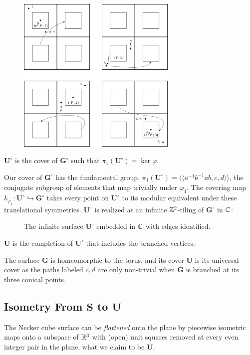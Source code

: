 \documentclass[]{article}
\def\bU{\mathbf{U}} \def\btU{\tilde{\bU}} \def\bUs{\bU^\circ}
\def\bG{\mathbf{G}} \def\bGs{\mathbf{G}^\circ}
\def\<{\langle} \def\>{\rangle}
\begin{document}
\begin{figure}[H]
\centering
\includegraphics[width=3in]{coverdirection.png}
\end{figure}


\newpage
\begin{Def}
$\bUs$ is the cover of $\bGs$ such that $\pi_1(\bUs)=\ker\varphi$.
\end{Def}

Our cover of $\bGs$ has the fundamental group, $\pi_1(\bUs)=\<\<a^{-1}b^{-1}ab, c, d\>\>$, the conjugate subgroup of elements that map trivially under $\varphi_1$. The covering map $k_{\varphi_1}:\bUs\hookrightarrow\bGs$ takes every point on $\bUs$ to its modular equivalent under these translational symmetries. $\bUs$ is realized as an infinite $\mathbb{Z}^2$-tiling of $\bGs$ in $\mathbb{C}$:
\begin{figure}[H]
\centering

\caption{The infinite surface $\bUs$ embedded in $\mathbb{C}$ with edges identified.}
\end{figure}

\begin{Def}
$\bU$ is the completion of $\bUs$ that includes the branched vertices. 
\end{Def}

\begin{rem}
The surface $\bG$ is homeomorphic to the torus, and its cover $\bU$ is its universal cover as the paths labeled $c,d$ are only non-trivial when $\bG$ is branched at its three conical points.
\end{rem}

\subsection{}

\subsection{Isometry From $\mathbf{S}$ to $\bU$}
The Necker cube surface can be \emph{flattened} onto the plane by piecewise isometric maps onto a subspace of $\mathbb{R}^3$ with (open) unit squares removed at every even integer pair in the plane, what we claim to be $\bU$.
\end{document}
